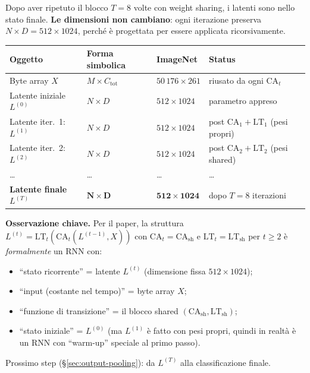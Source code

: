 \documentclass[
  11pt,
]{article}
\begin{document}
\begin{notabox}[title={\textbf{Checkpoint dimensioni --- fine \S1.4.11 (dopo $T = 8$ iterazioni)}}]
Dopo aver ripetuto il blocco $T = 8$ volte con weight sharing, i latenti sono nello stato finale. \textbf{Le dimensioni non cambiano}: ogni iterazione preserva $N \times D = 512 \times 1024$, perché è progettata per essere applicata ricorsivamente.

\medskip
\begin{center}
\begin{tabular}{@{}llll@{}}
\toprule
\textbf{Oggetto} & \textbf{Forma simbolica} & \textbf{ImageNet} & \textbf{Status} \\
\midrule
Byte array $X$ & $M \times C_{\text{tot}}$ & $50\,176 \times 261$ & riusato da ogni $\text{CA}_t$ \\
Latente iniziale $L^{(0)}$ & $N \times D$ & $512 \times 1024$ & parametro appreso \\
Latente iter.\ 1: $L^{(1)}$ & $N \times D$ & $512 \times 1024$ & post $\text{CA}_1 + \text{LT}_1$ (pesi propri) \\
Latente iter.\ 2: $L^{(2)}$ & $N \times D$ & $512 \times 1024$ & post $\text{CA}_2 + \text{LT}_2$ (pesi shared) \\
\dots & \dots & \dots & \dots \\
\textbf{Latente finale $L^{(T)}$} & $\boldsymbol{N \times D}$ & $\mathbf{512 \times 1024}$ & dopo $T=8$ iterazioni \\
\bottomrule
\end{tabular}
\end{center}

\medskip
\textbf{Osservazione chiave.} Per il paper, la struttura $L^{(t)} = \text{LT}_t(\text{CA}_t(L^{(t-1)}, X))$ con $\text{CA}_t = \text{CA}_{\text{sh}}$ e $\text{LT}_t = \text{LT}_{\text{sh}}$ per $t \geq 2$ è \emph{formalmente} un RNN con:
\begin{itemize}\setlength\itemsep{0.1em}
\item ``stato ricorrente'' = latente $L^{(t)}$ (dimensione fissa $512 \times 1024$);
\item ``input (costante nel tempo)'' = byte array $X$;
\item ``funzione di transizione'' = il blocco shared $(\text{CA}_{\text{sh}}, \text{LT}_{\text{sh}})$;
\item ``stato iniziale'' = $L^{(0)}$ (ma $L^{(1)}$ è fatto con pesi propri, quindi in realtà è un RNN con ``warm-up'' speciale al primo passo).
\end{itemize}

\medskip
Prossimo step (\S\ref{sec:output-pooling}): da $L^{(T)}$ alla classificazione finale.
\end{notabox}
\end{document}
